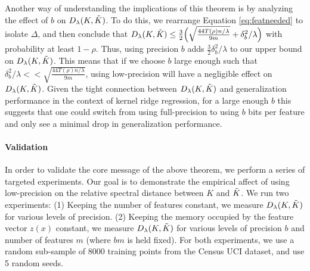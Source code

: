 Another way of understanding the implications of this theorem is by analyzing the effect of $b$ on $D_{\lambda}(K,\tilde{K})$. To do this, we rearrange Equation \ref{eq:featneeded} to isolate $\Delta$, and then conclude that $D_{\lambda}(K,\tilde{K}) \leq \frac{3}{2} \Big(\sqrt{\frac{44T(\rho)n/\lambda}{9m}} + \delta_b^2/\lambda\Big)$ with probability at least $1-\rho$.  Thus, using precision $b$ adds $\frac{3}{2}\delta_b^2/\lambda$ to our upper bound on $D_{\lambda}(K,\tilde{K})$.  This means that if we choose $b$ large enough such that $\delta_b^2/\lambda << \sqrt{\frac{44T(\rho)n/\lambda}{9m}}$, using low-precision will have a negligible effect on $D_{\lambda}(K,\tilde{K})$.  Given the tight connection between $D_{\lambda}(K,\tilde{K})$ and generalization performance in the context of kernel ridge regression, for a large enough $b$ this suggests that one could switch from using full-precision to using $b$ bits per feature and only see a minimal drop in generalization performance.





\paragraph{Validation} In order to validate the core message of the above theorem, we perform a series of targeted experiments. Our goal is to demonstrate the empirical affect of using low-precision on the relative spectral distance between $K$ and $\tilde{K}$. We run two experiments: (1) Keeping the number of features constant, we measure $D_{\lambda}(K,\tilde{K})$ for various levels of precision. (2) Keeping the memory occupied by the feature vector $z(x)$ constant, we measure $D_{\lambda}(K,\tilde{K})$ for various levels of precision $b$ and number of features $m$ (where $bm$ is held fixed). For both experiments, we use a random sub-sample of $8000$ training points from the Census UCI dataset, and use 5 random seeds.

